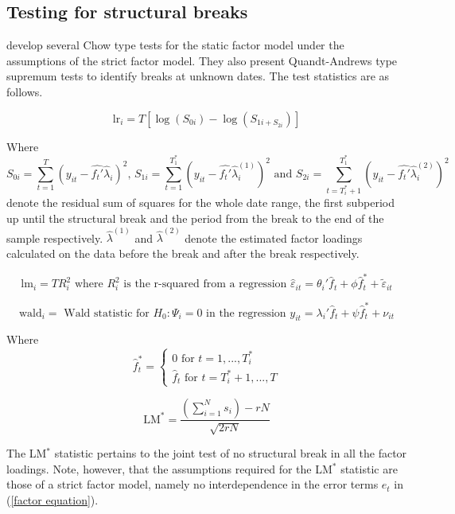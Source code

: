\documentclass[12pt]{article}
\begin{document}
\subsection{Testing for structural breaks}
\citet{breitung2011testing} develop several Chow type tests for the static factor model under the assumptions of the strict factor model. They also present Quandt-Andrews type supremum tests to identify breaks at unknown dates. The test statistics are as follows.


\begin{equation}
	\label{LR-Statistic}
	\text{lr}_i = T [ \log(S_{0i}) - \log(S_{1i + S_{2i}}) ]
\end{equation}

Where $$S_{0i} = \sum_{t=1}^{T}(y_{it} - \hat{f_t'} \hat \lambda_i)^2 \text{, } S_{1i} = \sum_{t=1}^{T_1^*}(y_{it} - \hat{f_t'} \hat \lambda_i^{(1)})^2 \text{ and } S_{2i} = \sum_{t=T^*_i+1}^{T_1^*}(y_{it} - \hat{f_t'} \hat \lambda_i^{(2)})^2 $$
denote the residual sum of squares for the whole date range, the first subperiod up until the structural break and the period from the break to the end of the sample respectively.
$\hat \lambda^{(1)}$ and $\hat \lambda^{(2)}$ denote the estimated factor loadings calculated on the data before the break and after the break respectively.

\begin{equation}
	\label{LM-Statistic}
	\text{lm}_i = T R^2_i \text{ where $R_i^2$ is the r-squared from a regression } \hat \varepsilon_{it} = \theta_i' \hat f_t + \phi \hat f_t^* + \tilde \varepsilon_{it}
\end{equation}

\begin{equation}
	\label{Wald-Statistic}
	\text{wald}_i = \text{ Wald statistic for $H_0: \Psi_i = 0$ in the regression } y_{it} = \lambda_i' \hat f_t + \psi \hat f_t^* + \nu_{it}
\end{equation}

Where 
$$\hat f_t^* = \begin{cases} 0 \text{ for } t=1, ..., T_i^* \\ \hat f_t \text{ for } t=T_i^*+1, ..., T \end{cases}$$

\begin{equation}
	\label{LM-Statistic}
	\text{LM}^* = \frac{\left( \sum_{i=1}^N s_i \right) -rN}{\sqrt{2rN}}
\end{equation}

The LM$^*$ statistic pertains to the joint test of no structural break in all the factor loadings. Note, however, that the assumptions required for the LM$^*$ statistic are those of a strict factor model, namely no interdependence in the error terms $e_t$ in (\ref{factor equation}).
\end{document}

